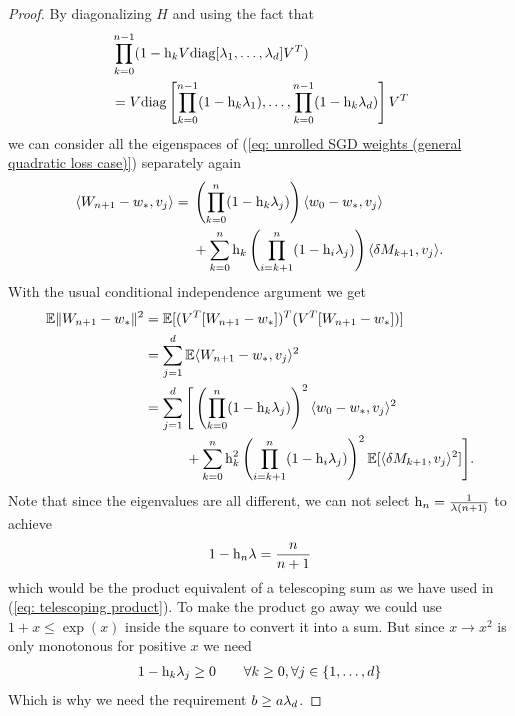 \begin{proof}
	By diagonalizing \(H\) and using the fact that
	\begin{align*}
		&\prod_{k=0}^{n-1} (1-\text{h}_k V\text{diag}[\lambda_1, \dots, \lambda_d]V^T)\\
		&= V \text{diag}\left[
			\prod_{k=0}^{n-1}(1-\text{h}_k\lambda_1),
			\dots, \prod_{k=0}^{n-1}(1-\text{h}_k\lambda_d)
		\right]V^T
	\end{align*}
	we can consider all the eigenspaces of (\ref{eq: unrolled SGD weights (general
	quadratic loss case)}) separately again
	\begin{align*}
		\langle W_{n+1}-w_*, v_j \rangle
		= \begin{aligned}[t]
			&\left(\prod_{k=0}^n(1-\text{h}_k\lambda_j)\right) \langle w_0-w_*, v_j\rangle\\
			&+ \sum_{k=0}^n \text{h}_k \left(\prod_{i=k+1}^n(1-\text{h}_i\lambda_j)\right)\langle\delta M_{k+1},v_j\rangle.
		\end{aligned}
	\end{align*}
	With the usual conditional independence argument we get
	\begin{align*}
		\mathbb{E}\|W_{n+1}-w_*\|^2
		&= \mathbb{E}[(V^T [W_{n+1}-w_*])^T(V^T[W_{n+1}-w_*])]\\
		&= \sum_{j=1}^d \mathbb{E}\langle W_{n+1}-w_*, v_j \rangle^2\\
		&= \sum_{j=1}^d
		\begin{aligned}[t]
			&\Bigg[\left(\prod_{k=0}^n(1-\text{h}_k\lambda_j)\right)^2 \langle w_0-w_*, v_j\rangle^2\\
			&+ \sum_{k=0}^n \text{h}_k^2 \left(\prod_{i=k+1}^n(1-\text{h}_i\lambda_j)\right)^2\mathbb{E}[\langle\delta M_{k+1},v_j\rangle^2]\Bigg].
		\end{aligned}
	\end{align*}
	Note that since the eigenvalues are all different, we can not select \(\text{h}_n=\frac{1}{\lambda(n+1)}\)
	to achieve
	\begin{align*}
		1-\text{h}_n\lambda = \frac{n}{n+1}
	\end{align*}
	which would be the product equivalent of a telescoping sum as we have used in
	(\ref{eq: telescoping product}). To make the product go away we could use
	\(1+x\le \exp(x)\) inside the square to convert it into a sum. But since \(x\to
	x^2\) is only monotonous for positive \(x\) we need
	\begin{align*}
		1-\text{h}_k \lambda_j \ge 0 \qquad \forall k\ge 0, \forall j \in\{1,\dots,d\}
	\end{align*}
	Which is why we need the requirement \(b\ge a\lambda_d\).


\end{proof}
